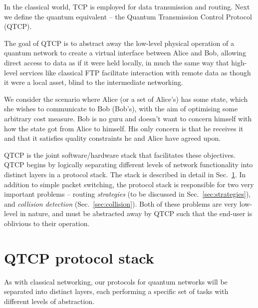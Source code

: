 \documentclass[aps,rmp,twocolumn,amsmath,amssymb,nofootinbib,superscriptaddress,longbibliography,floatfix]{revtex4-1}
\begin{document}
In the classical world, TCP is employed for data transmission and routing. Next we define the quantum equivalent -- the Quantum Transmission Control Protocol (QTCP).

The goal of QTCP is to abstract away the low-level physical operation of a quantum network to create a virtual interface between Alice and Bob, allowing direct access to data as if it were held locally, in much the same way that high-level services like classical FTP facilitate interaction with remote data as though it were a local asset, blind to the intermediate networking.

We consider the scenario where Alice (or a set of Alice's) has some state, which she wishes to communicate to Bob (Bob's), with the aim of optimising some arbitrary cost measure. Bob is no guru and doesn't want to concern himself with how the state got from Alice to himself. His only concern is that he receives it and that it satisfies quality constraints he and Alice have agreed upon.

QTCP is the joint software/hardware stack that facilitates these objectives. QTCP begins by logically separating different levels of network functionality into distinct layers in a protocol stack. The stack is described in detail in Sec.~\ref{sec:prot_stack}. In addition to simple packet switching, the protocol stack is responsible for two very important problems -- routing \emph{strategies} (to be discussed in Sec.~\ref{sec:strategies}), and \emph{collision detection} (Sec.~\ref{sec:collision}). Both of these problems are very low-level in nature, and must be abstracted away by QTCP such that the end-user is oblivious to their operation.

%
%

\section{QTCP protocol stack} \label{sec:prot_stack}

As with classical networking, our protocols for quantum networks will be separated into distinct layers, each performing a specific set of tasks with different levels of abstraction.
\end{document}
